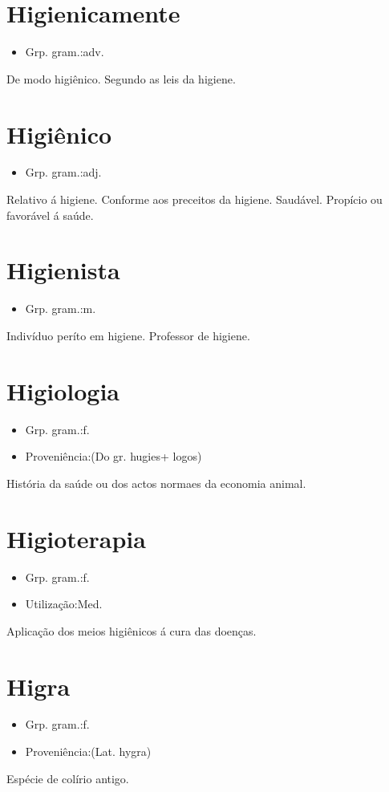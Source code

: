 \documentclass{article}
\begin{document}
\section{Higienicamente}
\begin{itemize}
\item {Grp. gram.:adv.}
\end{itemize}
De modo higiênico.
Segundo as leis da higiene.
\section{Higiênico}
\begin{itemize}
\item {Grp. gram.:adj.}
\end{itemize}
Relativo á higiene.
Conforme aos preceitos da higiene.
Saudável.
Propício ou favorável á saúde.
\section{Higienista}
\begin{itemize}
\item {Grp. gram.:m.}
\end{itemize}
Indivíduo períto em higiene.
Professor de higiene.
\section{Higiologia}
\begin{itemize}
\item {Grp. gram.:f.}
\end{itemize}
\begin{itemize}
\item {Proveniência:(Do gr. \textunderscore hugies\textunderscore  + \textunderscore logos\textunderscore )}
\end{itemize}
História da saúde ou dos actos normaes da economia animal.
\section{Higioterapia}
\begin{itemize}
\item {Grp. gram.:f.}
\end{itemize}
\begin{itemize}
\item {Utilização:Med.}
\end{itemize}
Aplicação dos meios higiênicos á cura das doenças.
\section{Higra}
\begin{itemize}
\item {Grp. gram.:f.}
\end{itemize}
\begin{itemize}
\item {Proveniência:(Lat. \textunderscore hygra\textunderscore )}
\end{itemize}
Espécie de colírio antigo.
\end{document}
